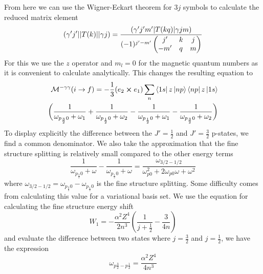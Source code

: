 From here we can use the Wigner-Eckart theorem for $3j$ symbols to calculate the reduced matrix element
\begin{equation}
    (\gamma'j'\abs{\abs{T(k)}}\gamma j)=
    \frac{(\gamma'j'm'\abs{T(kq)}\gamma j m)}
    {
    (-1)^{j'-m'}
    \begin{pmatrix}
    j'  &k  &j\\
    -m' &q  &m
    \end{pmatrix}
    }
\end{equation}
For this we use the $z$ operator and \(m_l=0\) for the magnetic quantum numbers as it is convenient to calculate analytically. This changes the resulting equation to
\begin{equation}
\begin{split}
    \mathcal{M}^{-\gamma\gamma}(i\rightarrow f)=
    -\frac{1}{3}(e_2\cross e_1)
    \sum_{n}\bra{1s}z\ket{np}\bra{np}z\ket{1s}\\
    \bigg(
    \frac{1}{\omega_{p_{\frac{3}{2}}0}+\omega_{1}}
    +
    \frac{1} {\omega_{p_{\frac{1}{2}}0}+\omega_{2}}
    -
    \frac{1} {\omega_{p_{\frac{1}{2}}0}+\omega_{1}}
    -
    \frac{1} {\omega_{p_{\frac{3}{2}}0}+\omega_{2}}
    \bigg)
    \end{split}
\end{equation}
To display explicitly the difference between the $J'=\frac{1}{2}$ and $J'=\frac{3}{2}$ p-states, we find a common denominator. We also take the approximation that the fine structure splitting is relatively small compared to the other energy terms
\begin{equation}
     \frac{1}{\omega_{p_{\frac{3}{2}}0}+\omega}
     - \frac{1} {\omega_{p_{\frac{1}{2}}0}+\omega}
     =\frac{\omega_{3/2-1/2}}{\omega_{p0}^2+2\omega_{p0}\omega+\omega^2}
\end{equation}
where $\omega_{3/2-1/2}=\omega_{p_{\frac{3}{2}}0}-\omega_{p_{\frac{1}{2}}0}$ is the fine structure splitting. Some difficulty comes from calculating this value for a variational basis set. We use the equation for calculating the fine structure energy shift \cite{bethe}
\begin{equation}
    W_1=-\frac{\alpha^2Z^4}{2n^3}\left(\frac{1}{j+\frac{1}{2}}-\frac{3}{4n}\right)
\end{equation}
and evaluate the difference between two states where $j= \frac{3}{2}$ and $j=\frac{1}{2}$, we have the expression
\begin{equation}
    \omega_{p\frac{3}{2}-p\frac{1}{2}}=\frac{\alpha^2Z^4}{4n^3}
\end{equation}

